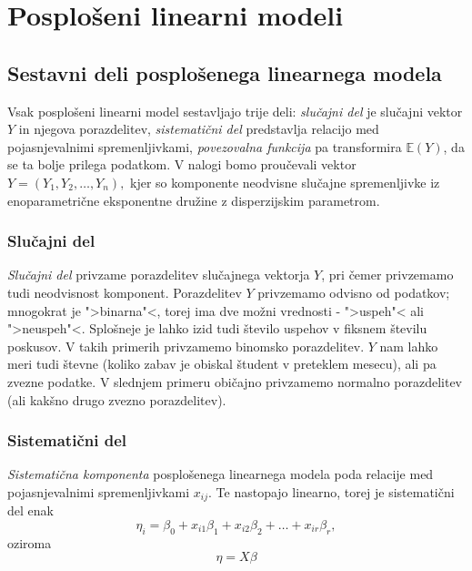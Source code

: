 \documentclass[12pt,a4paper]{amsart}
\theoremstyle{definition} %
\theoremstyle{plain} %
\begin{document}
\section{Posplošeni linearni modeli}

\subsection{Sestavni deli posplošenega linearnega modela}
Vsak posplošeni linearni model sestavljajo trije deli: \textit{slučajni del} je slučajni vektor $Y$ in njegova porazdelitev, 
\textit{sistematični del} predstavlja relacijo med pojasnjevalnimi spremenljivkami, \textit{povezovalna funkcija} pa transformira $\mathbb{E}(Y)$, da se ta
bolje prilega podatkom. V nalogi bomo proučevali vektor $Y = (Y_{1},Y_{2},\ldots,Y_{n}),$ kjer so komponente neodvisne slučajne spremenljivke iz enoparametrične
eksponentne družine z disperzijskim parametrom.

\subsubsection{Slučajni del}
\textit{Slučajni del} privzame porazdelitev slučajnega vektorja $Y$, pri čemer privzemamo tudi neodvisnost komponent. Porazdelitev $Y$
privzemamo odvisno od podatkov; mnogokrat je ">binarna"<, torej ima dve možni vrednosti - ">uspeh"< ali ">neuspeh"<. Splošneje je lahko izid tudi 
število uspehov v fiksnem številu poskusov. V takih primerih privzamemo binomsko porazdelitev. $Y$ nam lahko meri tudi števne (koliko zabav je obiskal študent v preteklem mesecu), 
ali pa zvezne podatke. V slednjem primeru običajno privzamemo normalno porazdelitev (ali kakšno drugo zvezno porazdelitev).
\subsubsection{Sistematični del} 
\textit{Sistematična komponenta} posplošenega linearnega modela poda relacije med pojasnjevalnimi spremenljivkami $x_{ij}$. Te nastopajo 
linearno, torej je sistematični del enak
\[
\eta_{i} = \beta_{0} + x_{i1}\beta_{1} + x_{i2}\beta_{2} + \ldots + x_{ir}\beta_{r},
\]
oziroma
\[
    \eta = X\beta
\]
\end{document}
